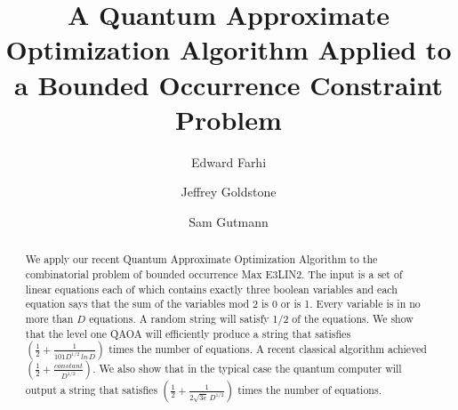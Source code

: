 \documentclass[t11pt,preprint,preprintnumbers]{revtex4}
\begin{document}
\title{A Quantum Approximate Optimization Algorithm Applied to a Bounded Occurrence Constraint Problem}
\author{Edward Farhi}
\author{Jeffrey Goldstone}
\author{Sam Gutmann}



\begin{abstract}
We apply our recent Quantum Approximate Optimization Algorithm \cite{farhi-2014} to the combinatorial problem of bounded occurrence Max E3LIN2. The input is a set of linear equations each of which contains exactly three boolean variables and each equation says that the sum of the variables mod 2 is 0 or is 1. Every variable is in no more than $D$ equations.  A random string will satisfy 1/2 of the equations.  We show that the level one QAOA will efficiently produce a string that satisfies $\left(\frac{1}{2} + \frac{1}{101 D^{1/2}\, l n\, D}\right)$ times the number of equations.  A recent classical algorithm \cite{Boaz-2015, hastad-2015} achieved  $\left(\frac{1}{2} + \frac{constant}{D^{1/2}}\right)$.  We also show that in the typical case the quantum computer will output a string that satisfies $\left(\frac{1}{2}+ \frac{1}{2\sqrt{3e}\, D^{1/2}}\right)$ times the number of equations.  
\end{abstract}

\maketitle
\end{document}
